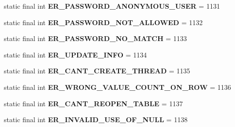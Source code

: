 \begin{DoxyCompactItemize}
static final int {\bfseries E\+R\+\_\+\+P\+A\+S\+S\+W\+O\+R\+D\+\_\+\+A\+N\+O\+N\+Y\+M\+O\+U\+S\+\_\+\+U\+S\+ER} = 1131
\item 
\mbox{\label{classcom_1_1mysql_1_1jdbc_1_1_mysql_error_numbers_a7b7c3643fc745cefd165cfeb48b04f02}} 
static final int {\bfseries E\+R\+\_\+\+P\+A\+S\+S\+W\+O\+R\+D\+\_\+\+N\+O\+T\+\_\+\+A\+L\+L\+O\+W\+ED} = 1132
\item 
\mbox{\label{classcom_1_1mysql_1_1jdbc_1_1_mysql_error_numbers_af4921255aa636d78795d6232406648cd}} 
static final int {\bfseries E\+R\+\_\+\+P\+A\+S\+S\+W\+O\+R\+D\+\_\+\+N\+O\+\_\+\+M\+A\+T\+CH} = 1133
\item 
\mbox{\label{classcom_1_1mysql_1_1jdbc_1_1_mysql_error_numbers_a11d201ac3e28951cd5f732b6885d8934}} 
static final int {\bfseries E\+R\+\_\+\+U\+P\+D\+A\+T\+E\+\_\+\+I\+N\+FO} = 1134
\item 
\mbox{\label{classcom_1_1mysql_1_1jdbc_1_1_mysql_error_numbers_aadb16e881423865720b3a2ad646bd7eb}} 
static final int {\bfseries E\+R\+\_\+\+C\+A\+N\+T\+\_\+\+C\+R\+E\+A\+T\+E\+\_\+\+T\+H\+R\+E\+AD} = 1135
\item 
\mbox{\label{classcom_1_1mysql_1_1jdbc_1_1_mysql_error_numbers_af067bd4d9b1a72d7f74b6ea11e9996a1}} 
static final int {\bfseries E\+R\+\_\+\+W\+R\+O\+N\+G\+\_\+\+V\+A\+L\+U\+E\+\_\+\+C\+O\+U\+N\+T\+\_\+\+O\+N\+\_\+\+R\+OW} = 1136
\item 
\mbox{\label{classcom_1_1mysql_1_1jdbc_1_1_mysql_error_numbers_a241fc68d42b565e74a1a7ede9b93571a}} 
static final int {\bfseries E\+R\+\_\+\+C\+A\+N\+T\+\_\+\+R\+E\+O\+P\+E\+N\+\_\+\+T\+A\+B\+LE} = 1137
\item 
\mbox{\label{classcom_1_1mysql_1_1jdbc_1_1_mysql_error_numbers_a0cfd65c29585aa32500e91b517ecf8d2}} 
static final int {\bfseries E\+R\+\_\+\+I\+N\+V\+A\+L\+I\+D\+\_\+\+U\+S\+E\+\_\+\+O\+F\+\_\+\+N\+U\+LL} = 1138
\item 

\end{DoxyCompactItemize}
